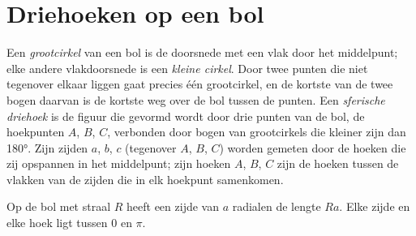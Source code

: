 \section{Driehoeken op een bol}

\begin{definition}\label{def:b1:spherical-astronomy:spherical-triangle}
Een \emph{grootcirkel} van een bol is de doorsnede met een
vlak door het middelpunt; elke andere vlakdoorsnede is een
\emph{kleine cirkel}. Door twee punten die niet
tegenover elkaar liggen gaat precies één grootcirkel, en de kortste van de
twee bogen daarvan is de kortste weg over de bol tussen de punten. Een
\emph{sferische driehoek} is de figuur die gevormd
wordt door drie punten van de bol, de hoekpunten $A$, $B$, $C$, verbonden door
bogen van grootcirkels die kleiner zijn dan \ang{180}. Zijn zijden $a$, $b$, $c$
(tegenover $A$, $B$, $C$) worden gemeten door de hoeken die zij opspannen in
het middelpunt; zijn hoeken $A$, $B$, $C$ zijn de hoeken tussen de vlakken van
de zijden die in elk hoekpunt samenkomen.
\end{definition}

Op de bol met straal $R$ heeft een zijde van $a$ radialen de lengte $Ra$. Elke
zijde en elke hoek ligt tussen $0$ en $\pi$.

